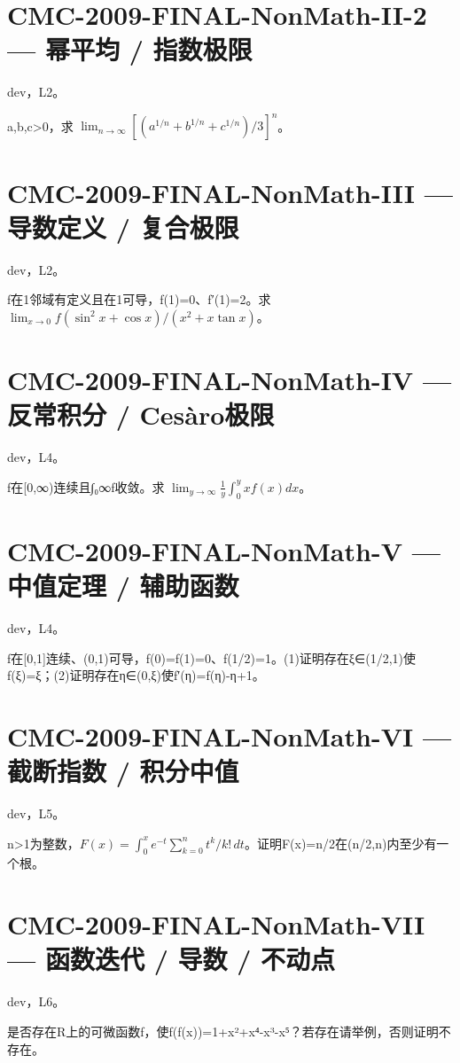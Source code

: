 \documentclass[UTF8]{ctexart}
\begin{document}
\section*{CMC-2009-FINAL-NonMath-II-2 — 幂平均 / 指数极限}

dev，L2。

a,b,c>0，求 $\lim_{n\to\infty}[(a^{1/n}+b^{1/n}+c^{1/n})/3]^n$。

\section*{CMC-2009-FINAL-NonMath-III — 导数定义 / 复合极限}

dev，L2。

f在1邻域有定义且在1可导，f(1)=0、f′(1)=2。求 $\lim_{x\to0}f(\sin^2x+\cos x)/(x^2+x\tan x)$。

\section*{CMC-2009-FINAL-NonMath-IV — 反常积分 / Cesàro极限}

dev，L4。

f在[0,∞)连续且∫₀∞f收敛。求 $\lim_{y\to\infty}\frac1y\int_0^yxf(x)dx$。

\section*{CMC-2009-FINAL-NonMath-V — 中值定理 / 辅助函数}

dev，L4。

f在[0,1]连续、(0,1)可导，f(0)=f(1)=0、f(1/2)=1。(1)证明存在ξ∈(1/2,1)使f(ξ)=ξ；(2)证明存在η∈(0,ξ)使f′(η)=f(η)-η+1。

\section*{CMC-2009-FINAL-NonMath-VI — 截断指数 / 积分中值}

dev，L5。

n>1为整数，$F(x)=\int_0^xe^{-t}\sum_{k=0}^nt^k/k!\,dt$。证明F(x)=n/2在(n/2,n)内至少有一个根。

\section*{CMC-2009-FINAL-NonMath-VII — 函数迭代 / 导数 / 不动点}

dev，L6。

是否存在R上的可微函数f，使f(f(x))=1+x²+x⁴-x³-x⁵？若存在请举例，否则证明不存在。
\end{document}
